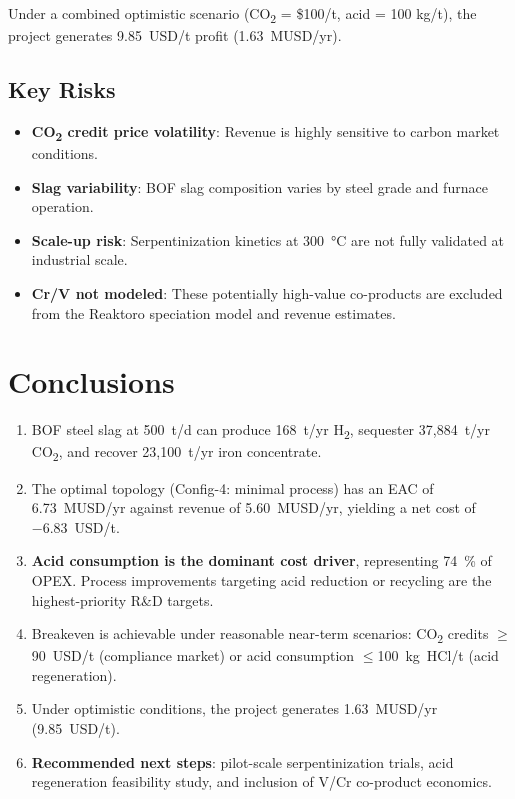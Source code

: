 \documentclass[11pt,a4paper]{article}
\begin{document}
Under a combined optimistic scenario (CO\textsubscript{2} = \$100/t, acid = 100 kg/t), the project generates \SI{+9.85}{USD/t} profit (\SI{1.63}{MUSD/yr}).

\subsection{Key Risks}

\begin{itemize}[noitemsep]
  \item \textbf{CO\textsubscript{2} credit price volatility}: Revenue is highly sensitive to carbon market conditions.
  \item \textbf{Slag variability}: BOF slag composition varies by steel grade and furnace operation.
  \item \textbf{Scale-up risk}: Serpentinization kinetics at \SI{300}{\celsius} are not fully validated at industrial scale.
  \item \textbf{Cr/V not modeled}: These potentially high-value co-products are excluded from the Reaktoro speciation model and revenue estimates.
\end{itemize}

\section{Conclusions}

\begin{enumerate}
  \item BOF steel slag at \SI{500}{t/d} can produce 168~t/yr H\textsubscript{2}, sequester 37,884~t/yr CO\textsubscript{2}, and recover 23,100~t/yr iron concentrate.
  \item The optimal topology (Config-4: minimal process) has an EAC of \SI{6.73}{MUSD/yr} against revenue of \SI{5.60}{MUSD/yr}, yielding a net cost of \SI{-6.83}{USD/t}.
  \item \textbf{Acid consumption is the dominant cost driver}, representing \SI{74}{\percent} of OPEX. Process improvements targeting acid reduction or recycling are the highest-priority R\&D targets.
  \item Breakeven is achievable under reasonable near-term scenarios: CO\textsubscript{2} credits $\geq$\SI{90}{USD/t} (compliance market) or acid consumption $\leq$\SI{100}{kg HCl/t} (acid regeneration).
  \item Under optimistic conditions, the project generates \SI{+1.63}{MUSD/yr} (\SI{+9.85}{USD/t}).
  \item \textbf{Recommended next steps}: pilot-scale serpentinization trials, acid regeneration feasibility study, and inclusion of V/Cr co-product economics.
\end{enumerate}
\end{document}
